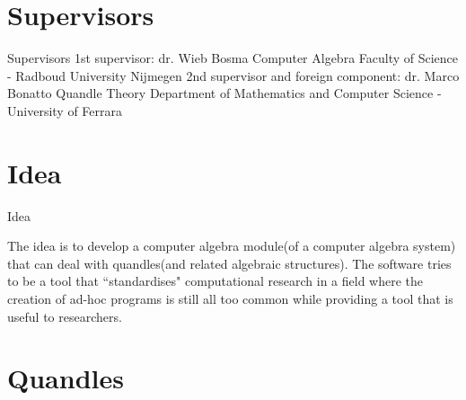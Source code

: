 \section{Supervisors}
 \frame{\sectionpage}


\begin{frame}{Supervisors}
1st supervisor:\newline
dr. Wieb Bosma\newline
Computer Algebra\newline
Faculty of Science - Radboud University Nijmegen\newline\newline
2nd supervisor and foreign component:\newline
dr. Marco Bonatto\newline
Quandle Theory\newline
Department of Mathematics and Computer Science - University of Ferrara
\end{frame}   


\section{Idea}
 \frame{\sectionpage}


\begin{frame}{Idea}

The idea is to develop a computer algebra module(of a computer algebra system) that can deal with quandles(and related algebraic structures).\newline \newline
The software tries to be a tool that ``standardises" computational research in a field where the creation of ad-hoc programs is still all too common while providing a tool that is useful to researchers. 
\end{frame}   




\section{Quandles}
 \frame{\sectionpage}


